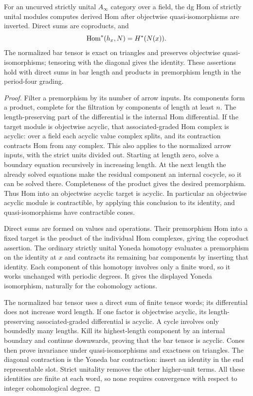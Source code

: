 \begin{lemma}
\label{per:module-calculus}
For an uncurved strictly unital $A_\infty$ category over a field,
the dg Hom of strictly unital modules computes
derived Hom after objectwise quasi-isomorphisms are inverted.  Direct
sums are coproducts, and
\[
 \operatorname{Hom}^*(h_x,N)=H^*(N(x)).
\]
The normalized bar tensor is exact on triangles and preserves
objectwise quasi-isomorphisms; tensoring with the diagonal gives the
identity.  These assertions hold with direct sums in bar length and
products in premorphism length in the period-four grading.
\end{lemma}

\begin{proof}
Filter a premorphism by its number of arrow inputs.  Its components
form a product, complete for the filtration by components of length
at least $n$.  The length-preserving part of the differential is the
internal Hom differential.  If the target module is objectwise
acyclic, that associated-graded Hom complex is acyclic: over a field
each acyclic value complex splits, and its contraction contracts Hom
from any complex.  This also applies to the normalized arrow inputs,
with the strict units divided out.  Starting at length zero, solve a
boundary equation recursively in increasing length.  At the next
length the already solved equations make the residual component an
internal cocycle, so it can be solved there.  Completeness of the
product gives the desired premorphism.  Thus Hom into an objectwise
acyclic target is acyclic.  In particular an objectwise acyclic
module is contractible, by applying this conclusion to its identity,
and quasi-isomorphisms have contractible cones.

Direct sums are formed on values and operations.  Their premorphism
Hom into a fixed target is the product of the individual Hom
complexes, giving the coproduct assertion.  The ordinary strictly
unital Yoneda homotopy evaluates a premorphism on the identity at
$x$ and contracts its remaining bar components by inserting that
identity.  Each component of this homotopy involves only a finite
word, so it works unchanged with periodic degrees.  It gives the
displayed Yoneda isomorphism, naturally for the cohomology actions.

The normalized bar tensor uses a direct sum of finite tensor words;
its differential does not increase word length.  If one factor is
objectwise acyclic, its length-preserving associated-graded
differential is acyclic.  A cycle involves only boundedly many
lengths.  Kill its highest-length component by an internal boundary
and continue downwards, proving that the bar tensor is acyclic.
Cones then prove invariance under quasi-isomorphisms and exactness
on triangles.  The diagonal contraction is the Yoneda bar
contraction: insert an identity in the end representable slot.
Strict unitality removes the other higher-unit terms.  All these
identities are finite at each word, so none requires convergence
with respect to integer cohomological degree.
\end{proof}

